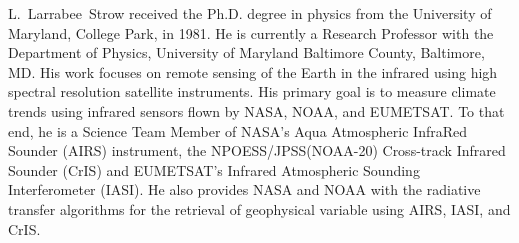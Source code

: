 \documentclass[journal]{IEEEtran}
\begin{document}
\vspace{-14cm}

\begin{IEEEbiography}{L.~Larrabee~Strow}
  received the Ph.D. degree in physics from the University of
  Maryland, College Park, in 1981. He is currently a Research
  Professor with the Department of Physics, University of Maryland
  Baltimore County, Baltimore, MD. His work focuses on remote
  sensing of the Earth in the infrared using high spectral
  resolution satellite instruments. His primary goal is to measure
  climate trends using infrared sensors flown by NASA, NOAA, and
  EUMETSAT. To that end, he is a Science Team Member of NASA’s Aqua
  Atmospheric InfraRed Sounder (AIRS) instrument, the
  NPOESS/JPSS(NOAA-20) Cross-track Infrared Sounder (CrIS) and
  EUMETSAT's Infrared Atmospheric Sounding Interferometer (IASI).
  He also provides NASA and NOAA with the radiative transfer
  algorithms for the retrieval of geophysical variable using AIRS,
  IASI, and CrIS.
\end{IEEEbiography}
\end{document}

